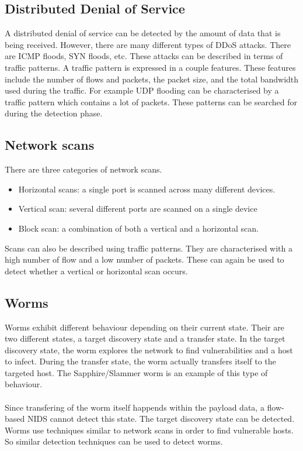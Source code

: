 \subsection{Distributed Denial of Service}
A distributed denial of service can be detected by the amount of data that is being received. However, there are many different types of DDoS attacks. There are ICMP floods, SYN floods, etc. These attacks can be described in terms of traffic patterns. A traffic pattern is expressed in a couple features. These features include the number of flows and packets, the packet size, and the total bandwidth used during the traffic. For example UDP flooding can be characterised by a traffic pattern which contains a lot of packets. These patterns can be searched for during the detection phase. \cite{kim2004flow}
\subsection{Network scans}
There are three categories of network scans.
\begin{itemize}
\item Horizontal scans: a single port is scanned across many different devices.
\item Vertical scan: several different ports are scanned on a single device
\item Block scan: a combination of both a vertical and a horizontal scan.
\end{itemize}
\noindent Scans can also be described using traffic patterns. They are characterised with a high number of flow and a low number of packets. These can again be used to detect whether a vertical or horizontal scan occurs. \cite{IPFlow} \cite{kim2004flow}

\subsection{Worms}
Worms exhibit different behaviour depending on their current state. Their are two different states, a target discovery state and a transfer state. In the target discovery state, the worm explores the network to find vulnerabilities and a host to infect. During the transfer state, the worm actually transfers itself to the targeted host. The Sapphire/Slammer worm is an example of this type of behaviour. \cite{moore2003inside}\\
\\
Since transfering of the worm itself happends within the payload data, a flow-based NIDS cannot detect this state. The target discovery state can be detected. Worms use techniques similar to network scans in order to find vulnerable hosts. So similar detection techniques can be used to detect worms. \cite{abuadlla2014flow}

